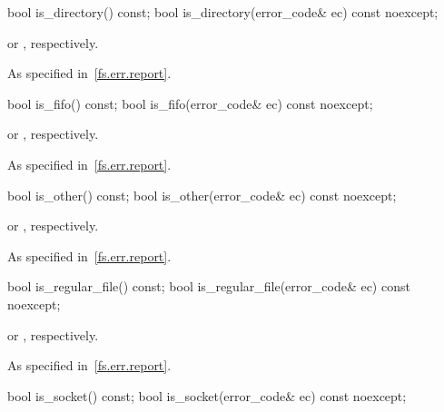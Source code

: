 %
\begin{itemdecl}
bool is_directory() const;
bool is_directory(error_code& ec) const noexcept;
\end{itemdecl}

\begin{itemdescr}
\pnum
\returns {} or , respectively.

\pnum
\throws As specified in~\ref{fs.err.report}.
\end{itemdescr}

%
\begin{itemdecl}
bool is_fifo() const;
bool is_fifo(error_code& ec) const noexcept;
\end{itemdecl}

\begin{itemdescr}
\pnum
\returns {} or , respectively.

\pnum
\throws As specified in~\ref{fs.err.report}.
\end{itemdescr}

%
\begin{itemdecl}
bool is_other() const;
bool is_other(error_code& ec) const noexcept;
\end{itemdecl}

\begin{itemdescr}
\pnum
\returns {} or , respectively.

\pnum
\throws As specified in~\ref{fs.err.report}.
\end{itemdescr}

%
\begin{itemdecl}
bool is_regular_file() const;
bool is_regular_file(error_code& ec) const noexcept;
\end{itemdecl}

\begin{itemdescr}
\pnum
\returns {} or , respective\-ly.

\pnum
\throws As specified in~\ref{fs.err.report}.
\end{itemdescr}

%
\begin{itemdecl}
bool is_socket() const;
bool is_socket(error_code& ec) const noexcept;
\end{itemdecl}

